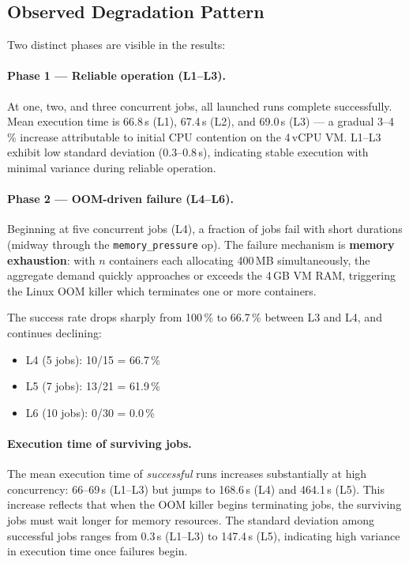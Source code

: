 \subsection{Observed Degradation Pattern}
\label{subsec:exp1-degradation}

Two distinct phases are visible in the results:

\paragraph{Phase 1 --- Reliable operation (L1--L3).}
At one, two, and three concurrent jobs, all launched runs complete successfully.
Mean execution time is 66.8\,s (L1), 67.4\,s (L2), and 69.0\,s (L3) --- a gradual 3--4\,\% increase attributable to initial CPU contention on the 4\,vCPU VM.
L1--L3 exhibit low standard deviation (0.3--0.8\,s), indicating stable execution with minimal variance during reliable operation.

\paragraph{Phase 2 --- OOM-driven failure (L4--L6).}
Beginning at five concurrent jobs (L4), a fraction of jobs fail with short durations (midway through the \texttt{memory\_pressure} op).
The failure mechanism is \textbf{memory exhaustion}: with $n$ containers each allocating 400\,MB simultaneously, the aggregate demand quickly approaches or exceeds the 4\,GB VM RAM, triggering the Linux OOM killer which terminates one or more containers.

The success rate drops sharply from 100\,\% to 66.7\,\% between L3 and L4, and continues declining:
\begin{itemize}
  \item L4 (5 jobs): 10/15 = 66.7\,\%
  \item L5 (7 jobs): 13/21 = 61.9\,\%
  \item L6 (10 jobs): 0/30 = 0.0\,\%
\end{itemize}

\paragraph{Execution time of surviving jobs.}
The mean execution time of \emph{successful} runs increases substantially at high concurrency: 66--69\,s (L1--L3) but jumps to 168.6\,s (L4) and 464.1\,s (L5).
This increase reflects that when the OOM killer begins terminating jobs, the surviving jobs must wait longer for memory resources.
The standard deviation among successful jobs ranges from 0.3\,s (L1--L3) to 147.4\,s (L5), indicating high variance in execution time once failures begin.

